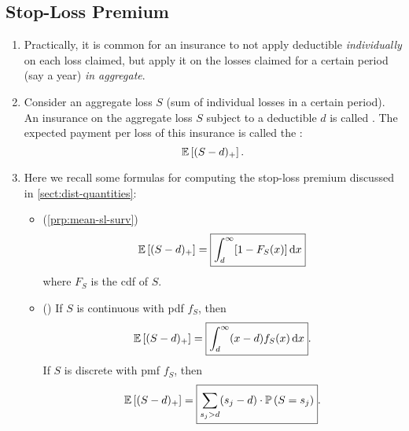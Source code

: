 \subsection{Stop-Loss Premium}
\begin{enumerate}
\item Practically, it is common for an insurance to not apply deductible
\emph{individually} on each loss claimed, but apply it on the losses claimed
for a certain period (say a year) \emph{in aggregate}.

\item Consider an aggregate loss \(S\) (sum of individual losses in a certain
period). An insurance on the aggregate loss \(S\) subject to a deductible \(d\)
is called . The expected payment per loss of this
insurance is called the :
\[
\mathbb{E}\left[(S-d)_{+}\right].
\]

\item Here we recall some formulas for computing the stop-loss premium
discussed in \cref{sect:dist-quantities}:
\begin{itemize}
\item (\cref{prp:mean-sl-surv})
\[
\mathbb{E}\left[(S-d)_{+}\right]=\boxed{\int_{d}^{\infty}[1-F_S(x)]\dd{x}}
\]
where \(F_S\) is the cdf of \(S\).

\item () If \(S\) is continuous with
pdf \(f_S\), then
\[
\mathbb{E}\left[(S-d)_{+}\right]=\boxed{\int_{d}^{\infty}(x-d)f_S(x)\dd{x}}.
\]
If \(S\) is discrete with pmf \(f_S\), then
\[
\mathbb{E}\left[(S-d)_{+}\right]=\boxed{\sum_{s_j>d}^{}(s_j-d)\cdot \mathbb{P}\left(S=s_j\right)}.
\]
\end{itemize}


\end{enumerate}
